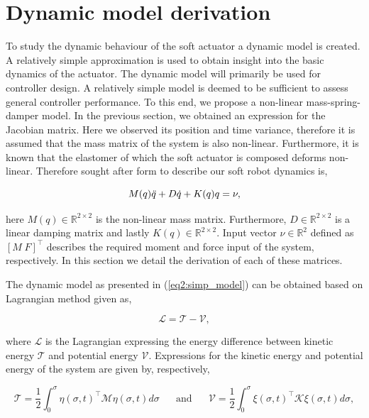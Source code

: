 \section{Dynamic model derivation}


To study the dynamic behaviour of the soft actuator a dynamic model is created. A relatively simple approximation is used to obtain insight into the basic dynamics of the actuator. The dynamic model will primarily be used for controller design. A relatively simple model is deemed to be sufficient to assess general controller performance. To this end, we propose a non-linear mass-spring-damper model. In the previous section, we obtained an expression for the Jacobian matrix. Here we observed its position and time variance, therefore it is assumed that the mass matrix of the system is also non-linear. Furthermore, it is known that the elastomer of which the soft actuator is composed deforms non-linear. Therefore sought after form to describe our soft robot dynamics is,


\begin{equation}
    M(q)\Ddot{q} + D\dot{q} + K(q)q = \nu,
    \label{eq2:simp_model}
\end{equation}


here $M(q) \in \mathbb{R}^{2\times 2}$ is the non-linear mass matrix. Furthermore, $D \in \mathbb{R}^{2\times2}$ is a linear damping matrix and lastly $K(q) \in \mathbb{R}^{2\times 2}$. Input vector $\nu \in \mathbb{R}^2$ defined as $[M \hspace{3pt} F]^\top$ describes the required moment and force input of the system, respectively. In this section we detail the derivation of each of these matrices. 

The dynamic model as presented in (\ref{eq2:simp_model}) can be obtained based on Lagrangian method given as,

\begin{equation}
\mathcal{L} = \mathcal{T} - \mathcal{V}, 
\end{equation}

where $\mathcal{L}$ is the Lagrangian expressing the energy difference between kinetic energy $\mathcal{T}$ and potential energy $\mathcal{V}$. Expressions for the kinetic energy and potential energy of the system are given by, respectively,

\begin{equation}
    \mathcal{T} = \frac{1}{2}\int_0^{\sigma} \eta(\sigma,t)^\top \mathcal{M} \eta(\sigma,t) d \sigma \hspace{20pt} \text{and} \hspace{20pt}  \mathcal{V} = \frac{1}{2}\int_0^{\sigma} \xi(\sigma,t)^\top \mathcal{K} \xi(\sigma,t) d \sigma,
    \label{eq2:T}
\end{equation}


